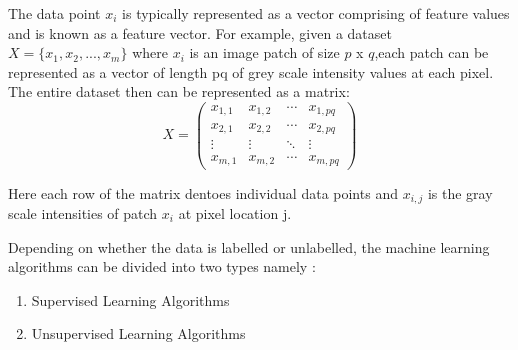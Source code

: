 The data point $x_i$ is typically represented as a vector comprising of feature values and is known as a feature vector. For example, given a dataset $X =\{x_1,x_2,...,x_m\}$ where $x_i$ is an image patch of size $p$ x $q$,each patch can be represented as a vector of length pq of grey scale intensity values at each pixel. The entire dataset then can be represented as a matrix:
\begin{equation*}
X = \begin{pmatrix}
x_{1,1} & x_{1,2} & \cdots & x_{1,pq} \\
x_{2,1} & x_{2,2} & \cdots & x_{2,pq} \\
\vdots  & \vdots  & \ddots & \vdots  \\
x_{m,1} & x_{m,2} & \cdots & x_{m,pq}
\end{pmatrix}
\end{equation*}

Here each row of the matrix dentoes individual data points and ${x_{i,j}}$ is the gray scale intensities of patch $x_i$ at pixel location j.

Depending on whether the data is labelled or unlabelled, the machine learning algorithms can be divided into two types namely :
\begin{enumerate}
	\item Supervised Learning Algorithms
	\item Unsupervised Learning Algorithms
\end{enumerate}

%
%
%
%
%

